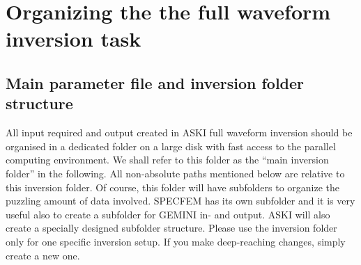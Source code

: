 %
\section{Organizing the the full waveform inversion task}
%
\subsection{Main parameter file and inversion folder structure}
\label{subsec:folder-structure}
%
 All input required and output created in ASKI full waveform inversion should be organised in a dedicated folder on a large disk with fast access to the parallel computing environment. We shall refer to this folder as the ``main inversion folder'' in the following. All non-absolute paths mentioned below are relative to this inversion folder. Of course, this folder will have subfolders to organize the puzzling amount of data involved. SPECFEM has its own subfolder and it is very useful also to create a subfolder for GEMINI in- and output. ASKI will also create a specially designed subfolder structure. Please use the inversion folder only for one specific inversion setup. If you make deep-reaching changes, simply create a new one.

